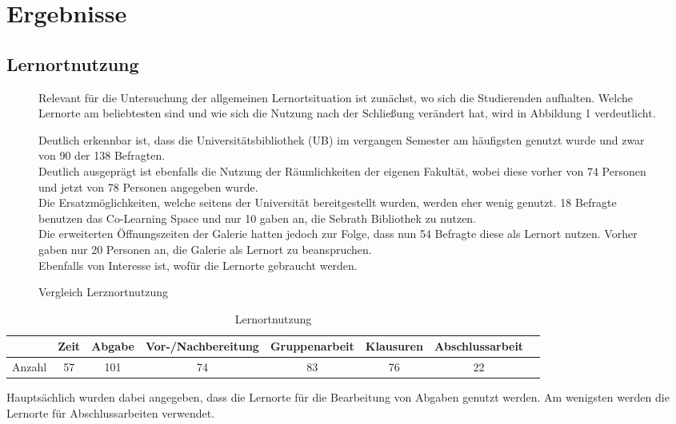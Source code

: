 \documentclass[11pt, a4paper]{article}
\begin{document}
\newpage
\section{Ergebnisse}
\subsection{Lernortnutzung}
\begin{figure}[h]
Relevant für die Untersuchung der allgemeinen Lernortsituation ist zunächst, wo sich die Studierenden aufhalten. Welche Lernorte am beliebtesten sind und wie sich die Nutzung nach der Schließung verändert hat, wird in Abbildung 1 verdeutlicht.

 
 \caption{Vergleich Lerznortnutzung }
\leavevmode

Deutlich erkennbar ist, dass die Universitätsbibliothek (UB) im vergangen Semester am häufigsten genutzt wurde und zwar von 90 der 138 Befragten.\\
Deutlich ausgeprägt ist ebenfalls die Nutzung der Räumlichkeiten der eigenen Fakultät, wobei diese vorher von 74 Personen und jetzt von 78 Personen angegeben wurde. \\
Die Ersatzmöglichkeiten, welche seitens der Universität bereitgestellt wurden, werden eher wenig genutzt. 18 Befragte benutzen das Co-Learning Space und nur 10 gaben an, die Sebrath Bibliothek zu nutzen.\\
Die erweiterten Öffnungszeiten der Galerie hatten jedoch zur Folge, dass nun 54 Befragte diese als Lernort nutzen. Vorher gaben nur 20 Personen an, die Galerie als Lernort zu beanspruchen.\\


Ebenfalls von Interesse ist, wofür die Lernorte gebraucht werden. 

\end{figure}
\begin{table}[h]
	\begin{tabular}{c|ccccccc}
		& Zeit & Abgabe & Vor-/Nachbereitung & Gruppenarbeit & Klausuren & Abschlussarbeit \\ \hline
		Anzahl & 57            & 101             & 74                          & 83                     & 76                 & 22                      
	\end{tabular}
		\caption{Lernortnutzung}
\end{table}

Hauptsächlich wurden dabei angegeben, dass die Lernorte für die Bearbeitung von Abgaben genutzt werden. Am wenigsten werden die Lernorte für Abschlussarbeiten verwendet.
\leavevmode
\end{document}
